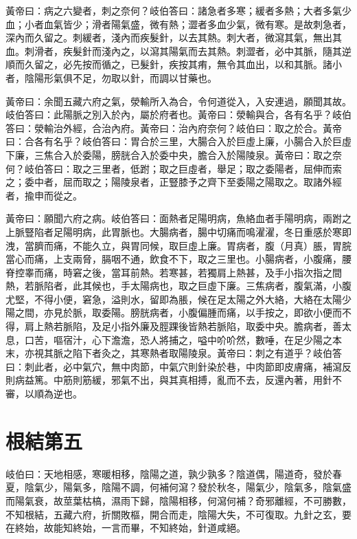 黃帝曰：病之六變者，刺之奈何？岐伯答曰：諸急者多寒；緩者多熱；大者多氣少血；小者血氣皆少；滑者陽氣盛，微有熱；澀者多血少氣，微有寒。是故刺急者，深內而久留之。刺緩者，淺內而疾髮針，以去其熱。刺大者，微瀉其氣，無出其血。刺滑者，疾髮針而淺內之，以瀉其陽氣而去其熱。刺澀者，必中其脈，隨其逆順而久留之，必先按而循之，已髮針，疾按其痏，無令其血出，以和其脈。諸小者，陰陽形氣俱不足，勿取以針，而調以甘藥也。

黃帝曰：余聞五藏六府之氣，滎輸所入為合，令何道從入，入安連過，願聞其故。岐伯答曰：此陽脈之別入於內，屬於府者也。黃帝曰：滎輸與合，各有名乎？岐伯答曰：滎輸治外經，合治內府。黃帝曰：治內府奈何？岐伯曰：取之於合。黃帝曰：合各有名乎？岐伯答曰：胃合於三里，大腸合入於巨虛上廉，小腸合入於巨虛下廉，三焦合入於委陽，膀胱合入於委中央，膽合入於陽陵泉。黃帝曰：取之奈何？岐伯答曰：取之三里者，低跗；取之巨虛者，舉足；取之委陽者，屈伸而索之；委中者，屈而取之；陽陵泉者，正豎膝予之齊下至委陽之陽取之。取諸外經者，揄申而從之。

黃帝曰：願聞六府之病。岐伯答曰：面熱者足陽明病，魚絡血者手陽明病，兩跗之上脈豎陷者足陽明病，此胃脈也。大腸病者，腸中切痛而鳴濯濯，冬日重感於寒即洩，當臍而痛，不能久立，與胃同候，取巨虛上廉。胃病者，腹（月真）脹，胃脘當心而痛，上支兩脅，膈咽不通，飲食不下，取之三里也。小腸病者，小腹痛，腰脊控睾而痛，時窘之後，當耳前熱。若寒甚，若獨肩上熱甚，及手小指次指之間熱，若脈陷者，此其候也，手太陽病也，取之巨虛下廉。三焦病者，腹氣滿，小腹尤堅，不得小便，窘急，溢則水，留即為脹，候在足太陽之外大絡，大絡在太陽少陽之間，亦見於脈，取委陽。膀胱病者，小腹偏腫而痛，以手按之，即欲小便而不得，肩上熱若脈陷，及足小指外廉及脛踝後皆熱若脈陷，取委中央。膽病者，善太息，口苦，嘔宿汁，心下澹澹，恐人將捕之，嗌中吤吤然，數唾，在足少陽之本末，亦視其脈之陷下者灸之，其寒熱者取陽陵泉。黃帝曰：刺之有道乎？岐伯答曰：刺此者，必中氣穴，無中肉節，中氣穴則針染於巷，中肉節即皮膚痛，補瀉反則病益篤。中筋則筋緩，邪氣不出，與其真相搏，亂而不去，反還內著，用針不審，以順為逆也。




\section{根結第五}

岐伯曰：天地相感，寒暖相移，陰陽之道，孰少孰多？陰道偶，陽道奇，發於春夏，陰氣少，陽氣多，陰陽不調，何補何瀉？發於秋冬，陽氣少，陰氣多，陰氣盛而陽氣衰，故莖葉枯槁，濕雨下歸，陰陽相移，何瀉何補？奇邪離經，不可勝數，不知根結，五藏六府，折關敗樞，開合而走，陰陽大失，不可復取。九針之玄，要在終始，故能知終始，一言而畢，不知終始，針道咸絕。

